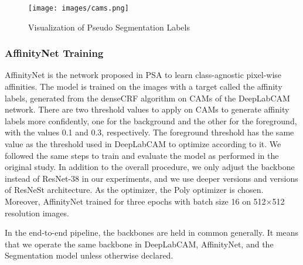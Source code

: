 \documentclass[sn-mathphys]{sn-jnl}
\theoremstyle{thmstyleone}
\theoremstyle{thmstyletwo}\newtheorem{example}{Example}\newtheorem{remark}{Remark}
\theoremstyle{thmstylethree}\newtheorem{definition}{Definition}
\begin{document}
\begin{figure}[!ht]
    \centering
    \texttt{[image: images/cams.png]}
    \caption{Visualization of Pseudo Segmentation Labels}
    \label{pseudo_labels}
\end{figure}

\subsubsection{AffinityNet Training}

AffinityNet is the network proposed in PSA to learn class-agnostic pixel-wise affinities. The model is trained on the images with a target called the affinity labels, generated from the denseCRF algorithm on CAMs of the DeepLabCAM network. There are two threshold values to apply on CAMs to generate affinity labels more confidently, one for the background and the other for the foreground, with the values 0.1 and 0.3, respectively. The foreground threshold has the same value as the threshold used in DeepLabCAM to optimize according to it. We followed the same steps to train and evaluate the model as performed in the original study. In addition to the overall procedure, we only adjust the backbone instead of ResNet-38 in our experiments, and we use deeper versions and versions of ResNeSt architecture. As the optimizer, the Poly optimizer is chosen. Moreover, AffinityNet trained for three epochs with batch size 16 on 512×512 resolution images.

In the end-to-end pipeline, the backbones are held in common generally. It means that we operate the same backbone in DeepLabCAM, AffinityNet, and the Segmentation model unless otherwise declared.
\end{document}
